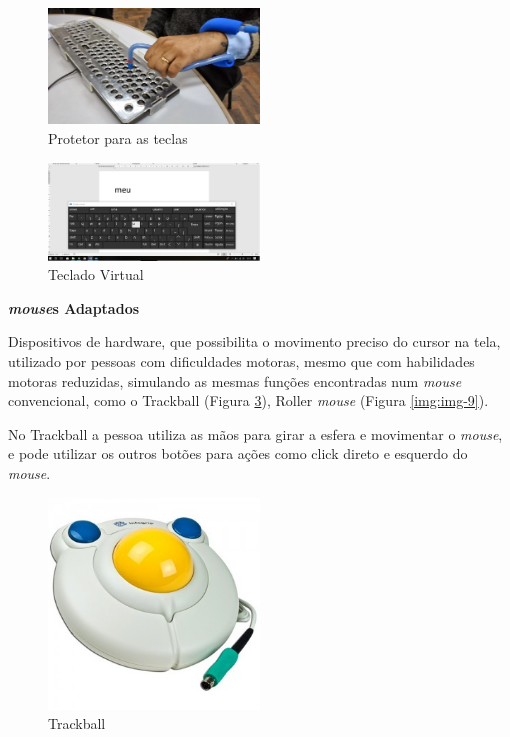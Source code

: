 \documentclass[
	12pt,			%
	openright,		%
	oneside,			%
	a4paper,			%
	chapter=TITLE,		%
	english,			%
	brazil,			%
	]{abntex2}
\begin{document}
\begin{figure}[H]
	\centering
		\includegraphics[width=0.5\textwidth]{./img/img-7.jpg}
		\caption{Protetor para as teclas}
		\label{img:img-7}
\end{figure}

\begin{figure}[H]
	\centering
		\includegraphics[width=0.5\textwidth]{./img/img-6.png}
		\caption{Teclado Virtual}
		\label{img:img-6}
\end{figure}

\textbf{\emph{mouse}s Adaptados}

Dispositivos de hardware, que possibilita o movimento preciso do cursor na tela, utilizado por pessoas com dificuldades motoras, mesmo que com habilidades motoras reduzidas, simulando as mesmas funções encontradas num \emph{mouse} convencional, como o Trackball (Figura \ref{img:img-8}), Roller \emph{mouse} (Figura \ref{img:img-9}).

No Trackball a pessoa utiliza as mãos para girar a esfera e movimentar o \emph{mouse}, e pode utilizar os outros botões para ações como click direto e esquerdo do \emph{mouse}.

\begin{figure}[H]
	\centering
		\includegraphics[width=0.5\textwidth]{./img/img-8.jpg}
		\caption{Trackball}
		\label{img:img-8}
\end{figure}
\end{document}
